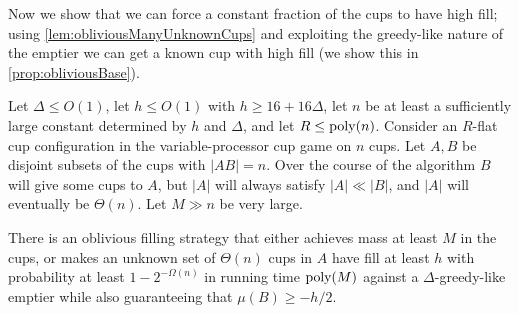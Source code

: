 Now we show that we can force a constant fraction of the cups to
have high fill; using \cref{lem:obliviousManyUnknownCups} and
exploiting the greedy-like nature of the emptier we can get a
known cup with high fill (we show this in
\cref{prop:obliviousBase}).
\begin{lemma}
  \label{lem:obliviousManyUnknownCups}
  Let $\Delta \le O(1)$, let $h \le O(1)$ with $h \ge
  16+16\Delta$, let $n$ be at least a sufficiently large constant
  determined by $h$ and $\Delta$, and let $R \le \operatorname{\text{poly}}(n)$.
  Consider an $R$-flat cup configuration in the
  variable-processor cup game on $n$ cups.
  Let $A, B$ be disjoint subsets of the cups with $|AB| = n$.
  Over the course of the algorithm $B$ will give some cups to
  $A$, but $|A|$ will always satisfy $|A| \ll |B|$, and $|A|$
  will eventually be $\Theta(n)$.
  Let $M\gg n$ be very large.

  There is an oblivious filling strategy that either achieves
  mass at least $M$ in the cups, or makes an unknown
  set of $\Theta(n)$ cups in $A$ have fill at least $h$ with
  probability at least $1-2^{-\Omega(n)}$ in running time
  $\operatorname{\text{poly}}(M)$ against a $\Delta$-greedy-like emptier while also
  guaranteeing that $\mu(B) \ge -h/2$.
\end{lemma}
